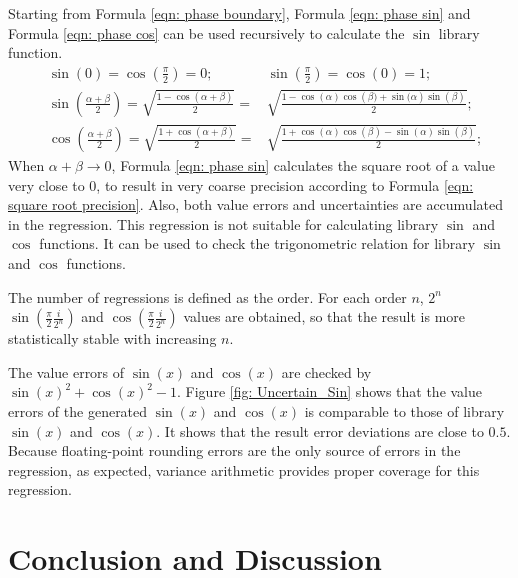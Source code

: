 \documentclass[twoside]{article}
\numberwithin{equation}{section}
\begin{document}
Starting from Formula \eqref{eqn: phase boundary}, Formula \eqref{eqn: phase sin} and Formula \eqref{eqn: phase cos} can be used recursively to calculate the $\sin$ library function.  
\begin{align}
\label{eqn: phase boundary}
& \sin(0) = \cos(\frac{\pi}{2}) = 0; & \sin(\frac{\pi}{2}) = \cos(0) = 1; \\
\label{eqn: phase sin}
& \sin \left(\frac{\alpha + \beta}{2} \right) = \sqrt{\frac{1 - \cos \left(\alpha + \beta \right)}{2}} = & \sqrt{\frac{1 - \cos(\alpha) \cos \left(\beta) + \sin(\alpha \right) \sin(\beta)}{2}}; \\
\label{eqn: phase cos}
& \cos \left(\frac{\alpha + \beta}{2} \right) = \sqrt{\frac{1 + \cos \left(\alpha + \beta \right)}{2}} = & \sqrt{\frac{1 + \cos(\alpha) \cos(\beta) - \sin(\alpha) \sin(\beta)}{2}};
\end{align}
When $\alpha + \beta \rightarrow 0$, Formula \eqref{eqn: phase sin} calculates the square root of a value very close to 0, to result in very coarse precision according to Formula \eqref{eqn: square root precision}.
Also, both value errors and uncertainties are accumulated in the regression.
This regression is not suitable for calculating library $\sin$ and $\cos$ functions.
It can be used to check the trigonometric relation for library $\sin$ and $\cos$ functions.

The number of regressions is defined as the order.
For each order $n$, $2^n$ $\sin(\frac{\pi}{2} \frac{i}{2^n})$ and $\cos(\frac{\pi}{2} \frac{i}{2^n})$ values are obtained, so that the result is more statistically stable with increasing $n$.

The value errors of $\sin(x)$ and $\cos(x)$ are checked by $\sin(x)^2 + \cos(x)^2 - 1$.
Figure \ref{fig: Uncertain_Sin} shows that the value errors of the generated $\sin(x)$ and $\cos(x)$ is comparable to those of library $\sin(x)$ and $\cos(x)$.
It shows that the result error deviations are close to $0.5$.
Because floating-point rounding errors are the only source of errors in the regression, as expected, variance arithmetic provides proper coverage for this regression.








\clearpage
\section{Conclusion and Discussion}
\label{sec: conclusion and discussion}
\end{document}
